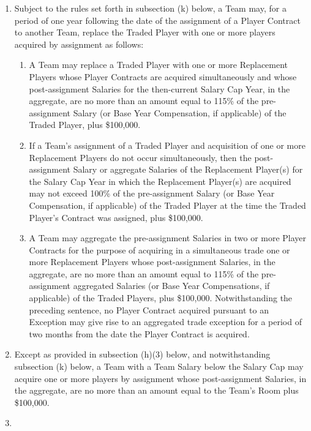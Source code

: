 \documentclass[
]{book}
\providecommand{\tightlist}{%
  \setlength{\itemsep}{0pt}\setlength{\parskip}{0pt}}
\begin{document}
\begin{enumerate}
  \begin{enumerate}
  \def\labelenumii{(\arabic{enumii})}
  \item
    Subject to the rules set forth in subsection (k) below, a Team may, for a period of one year following the date of the assignment of a Player Contract to another Team, replace the Traded Player with one or more players acquired by assignment as follows:

    \begin{enumerate}
    \def\labelenumiii{(\roman{enumiii})}
    \tightlist
    \item
      A Team may replace a Traded Player with one or more Replacement Players whose Player Contracts are acquired simultaneously and whose post-assignment Salaries for the then-current Salary Cap Year, in the aggregate, are no more than an amount equal to 115\% of the pre-assignment Salary (or Base Year Compensation, if applicable) of the Traded Player, plus \$100,000.
    \item
      If a Team's assignment of a Traded Player and acquisition of one or more Replacement Players do not occur simultaneously, then the post-assignment Salary or aggregate Salaries of the Replacement Player(s) for the Salary Cap Year in which the Replacement Player(s) are acquired may not exceed 100\% of the pre-assignment Salary (or Base Year Compensation, if applicable) of the Traded Player at the time the Traded Player's Contract was assigned, plus \$100,000.
    \item
      A Team may aggregate the pre-assignment Salaries in two or more Player Contracts for the purpose of acquiring in a simultaneous trade one or more Replacement Players whose post-assignment Salaries, in the aggregate, are no more than an amount equal to 115\% of the pre-assignment aggregated Salaries (or Base Year Compensations, if applicable) of the Traded Players, plus \$100,000. Notwithstanding the preceding sentence, no Player Contract acquired pursuant to an Exception may give rise to an aggregated trade exception for a period of two months from the date the Player Contract is acquired.
    \end{enumerate}
  \item
    Except as provided in subsection (h)(3) below, and notwithstanding subsection (k) below, a Team with a Team Salary below the Salary Cap may acquire one or more players by assignment whose post-assignment Salaries, in the aggregate, are no more than an amount equal to the Team's Room plus \$100,000.
  \item

\end{enumerate}
\end{enumerate}
\end{document}
